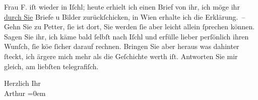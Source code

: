 \pstart
           Frau F. iſt wieder in Iſchl; heute erhielt ich einen Brief von ihr, ich möge ihr \uline{durch Sie} Briefe u Bilder zurückſchicken, in Wien erhalte ich die Erklärung. – Gehn Sie zu {\pb}Petter,{ }ſie ist \label{K_L00712-1v}\label{K_L00712-1} dort, Sie werden{ }ſie aber leicht allein{ }ſprechen können. Sagen Sie
               ihr, ich käme bald{ }ſelbſt nach Iſchl und erfülle
               lieber perſönlich ihren Wunſch,{ }ſie kö{\geminationn}e{ }ſicher darauf
               rechnen. {\pb}Bringen Sie aber heraus was dahinter{ }ſteckt,
               ich ärgere mich mehr als die Geſchichte werth iſt. Antworten Sie mir gleich, am
               liebſten telegrafiſch.\pend
           
\pstart
           Herzlich Ihr{\\[\baselineskip]}\spacefill\mbox{Arthur}\pend
           \leftskip=0em{}\endnumbering{}  \newcommand{\dateiname}{L00712}\newcommand{\titel}{Arthur Schnitzler an Richard Beer-Hofmann, 4. 8. 1897}\newcommand{\editorInnen}{Martin Anton Müller und Gerd-Hermann Susen}
